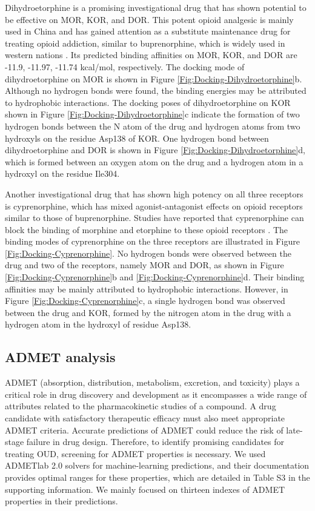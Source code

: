 \documentclass[10pt]{article}
\begin{document}
		Dihydroetorphine is a promising investigational drug that has shown potential to be effective on MOR, KOR, and DOR. This potent opioid analgesic is mainly used in China and has gained attention as a substitute maintenance drug for treating opioid addiction, similar to buprenorphine, which is widely used in western nations \cite{husbands2003opioid}. Its predicted binding affinities on MOR, KOR, and DOR are -11.9, -11.97, -11.74 kcal/mol, respectively. The docking mode of dihydroetorphine on MOR is shown in Figure \ref{Fig:Docking-Dihydroetorphine}b. Although no hydrogen bonds were found, the binding energies may be attributed to hydrophobic interactions. The docking poses of dihydroetorphine on KOR shown in Figure \ref{Fig:Docking-Dihydroetorphine}c indicate the formation of two hydrogen bonds between the N atom of the drug and hydrogen atoms from two hydroxyls on the residue Asp138 of KOR. One hydrogen bond between dihydroetorphine and DOR is shown in Figure \ref{Fig:Docking-Dihydroetorphine}d, which is formed between an oxygen atom on the drug and a hydrogen atom in a hydroxyl on the residue Ile304.
		
		Another investigational drug that has shown high potency on all three receptors is cyprenorphine, which has mixed agonist-antagonist effects on opioid receptors similar to those of buprenorphine. Studies have reported that cyprenorphine can block the binding of morphine and etorphine to these opioid receptors \cite{keep1971etorphine}. The binding modes of cyprenorphine on the three receptors are illustrated in Figure \ref{Fig:Docking-Cyprenorphine}. No hydrogen bonds were observed between the drug and two of the receptors, namely MOR and DOR, as shown in Figure \ref{Fig:Docking-Cyprenorphine}b and \ref{Fig:Docking-Cyprenorphine}d. Their binding affinities may be mainly attributed to hydrophobic interactions. However, in Figure \ref{Fig:Docking-Cyprenorphine}c, a single hydrogen bond was observed between the drug and KOR, formed by the nitrogen atom in the drug with a hydrogen atom in the hydroxyl of residue Asp138.
		
		
		\subsection{ADMET analysis}
		
		ADMET (absorption, distribution, metabolism, excretion, and toxicity) plays a critical role in drug discovery and development as it encompasses a wide range of attributes related to the pharmacokinetic studies of a compound. A drug candidate with satisfactory therapeutic efficacy must also meet appropriate ADMET criteria. Accurate predictions of ADMET could reduce the risk of late-stage failure in drug design. Therefore, to identify promising candidates for treating OUD, screening for ADMET properties is necessary. We used ADMETlab 2.0 solvers \cite{xiong2021admetlab,lei2016admet} for machine-learning predictions, and their documentation provides optimal ranges for these properties, which are detailed in Table S3 in the supporting information. We mainly focused on thirteen indexes of ADMET properties in their predictions.
		
\end{document}
